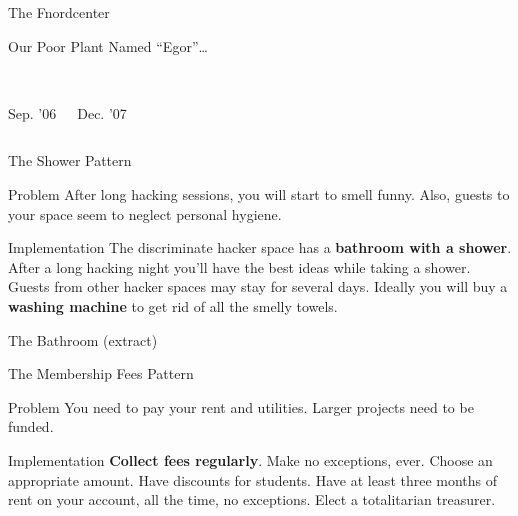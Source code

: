 \documentclass[mathserif]{beamer}
\begin{document}
\begin{frame}[plain]{The Fnordcenter}
	\begin{center}
	\end{center}
\end{frame}

\begin{frame}[plain]{Our Poor Plant Named “Egor”…}
	\begin{columns}
			\begin{center}
				\\
				Sep. '06
			\end{center}
			\begin{center}
				\\
				Dec. '07
			\end{center}
	\end{columns}
\end{frame}


\begin{frame}{The Shower Pattern}
	\begin{alertblock}{Problem}
		After long hacking sessions, you will start to smell funny.  Also, guests to
		your space seem to neglect personal hygiene.
	\end{alertblock}
	\pause
	\begin{exampleblock}{Implementation}
		The discriminate hacker space has a \textbf{bathroom with a shower}.  After a
		long hacking night you'll have the best ideas while taking a shower.  Guests
		from other hacker spaces may stay for several days.  Ideally you will buy a
		\textbf{washing machine} to get rid of all the smelly towels.
	\end{exampleblock}
\end{frame}

\begin{frame}[plain]{The Bathroom (extract)}
	\begin{center}
	\end{center}
\end{frame}

\begin{frame}{The Membership Fees Pattern}
	\begin{alertblock}{Problem}
		You need to pay your rent and utilities.  Larger projects need to be funded.
	\end{alertblock}
	\pause
	\begin{exampleblock}{Implementation}
		\textbf{Collect fees regularly}.  Make no exceptions, ever.  Choose an
		appropriate amount.  Have discounts for students.  Have at least three
		months of rent on your account, all the time, no exceptions.  Elect a
		totalitarian treasurer.
	\end{exampleblock}
\end{frame}
\end{document}
